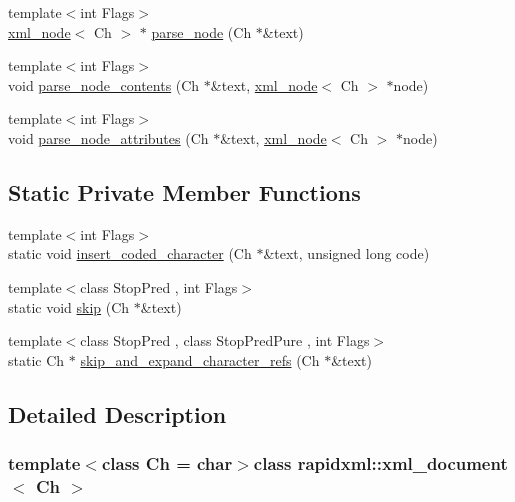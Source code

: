 \begin{DoxyCompactItemize}
\item 
{\footnotesize template$<$int Flags$>$ }\\\hyperlink{classrapidxml_1_1xml__node}{xml\+\_\+node}$<$ Ch $>$ $\ast$ \hyperlink{classrapidxml_1_1xml__document_a5e94cbc9b02e864cb80961ddb8cc63a7}{parse\+\_\+node} (Ch $\ast$\&text)
\item 
{\footnotesize template$<$int Flags$>$ }\\void \hyperlink{classrapidxml_1_1xml__document_aae0a4c2e1972ab9a9e0ce91cf1166ac9}{parse\+\_\+node\+\_\+contents} (Ch $\ast$\&text, \hyperlink{classrapidxml_1_1xml__node}{xml\+\_\+node}$<$ Ch $>$ $\ast$node)
\item 
{\footnotesize template$<$int Flags$>$ }\\void \hyperlink{classrapidxml_1_1xml__document_ac0b3cd07b3d5cbaa83762a196c681519}{parse\+\_\+node\+\_\+attributes} (Ch $\ast$\&text, \hyperlink{classrapidxml_1_1xml__node}{xml\+\_\+node}$<$ Ch $>$ $\ast$node)
\end{DoxyCompactItemize}
\subsection*{Static Private Member Functions}
\begin{DoxyCompactItemize}
\item 
{\footnotesize template$<$int Flags$>$ }\\static void \hyperlink{classrapidxml_1_1xml__document_ae33040bcfa8e5a29dc6f6f130984a981}{insert\+\_\+coded\+\_\+character} (Ch $\ast$\&text, unsigned long code)
\item 
{\footnotesize template$<$class Stop\+Pred , int Flags$>$ }\\static void \hyperlink{classrapidxml_1_1xml__document_a27aca5bdcb3bfa899f61b17d7f1d3a0d}{skip} (Ch $\ast$\&text)
\item 
{\footnotesize template$<$class Stop\+Pred , class Stop\+Pred\+Pure , int Flags$>$ }\\static Ch $\ast$ \hyperlink{classrapidxml_1_1xml__document_af86781975cdfff2105fa8c0b49ab4507}{skip\+\_\+and\+\_\+expand\+\_\+character\+\_\+refs} (Ch $\ast$\&text)
\end{DoxyCompactItemize}


\subsection{Detailed Description}
\subsubsection*{template$<$class Ch = char$>$class rapidxml\+::xml\+\_\+document$<$ Ch $>$}

